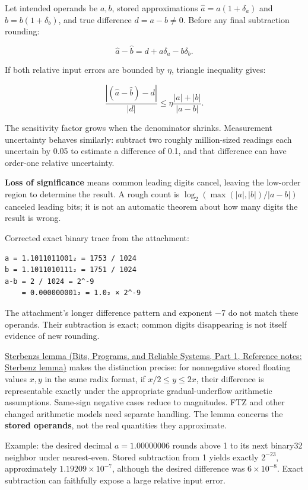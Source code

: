 Let intended operands be \(a,b\), stored approximations \(\widehat a=a(1+\delta_a)\) and \(\widehat b=b(1+\delta_b)\), and true difference \(d=a-b\ne0\). Before any final subtraction rounding:

\[
\widehat a-\widehat b=d+a\delta_a-b\delta_b.
\]

If both relative input errors are bounded by \(\eta\), triangle inequality gives:

\[
\frac{|(\widehat a-\widehat b)-d|}{|d|}
\le\eta\frac{|a|+|b|}{|a-b|}.
\]

The sensitivity factor grows when the denominator shrinks. Measurement uncertainty behaves similarly: subtract two roughly million-sized readings each uncertain by 0.05 to estimate a difference of 0.1, and that difference can have order-one relative uncertainty.

\textbf{Loss of significance} means common leading digits cancel, leaving the low-order region to determine the result. A rough count is \(\log_2(\max(|a|,|b|)/|a-b|)\) canceled leading bits; it is not an automatic theorem about how many digits the result is wrong.

Corrected exact binary trace from the attachment:

\begin{verbatim}
a = 1.1011011001₂ = 1753 / 1024
b = 1.1011010111₂ = 1751 / 1024
a-b = 2 / 1024 = 2^-9
    = 0.000000001₂ = 1.0₂ × 2^-9
\end{verbatim}

The attachment's longer difference pattern and exponent −7 do not match these operands. Their subtraction is exact; common digits disappearing is not itself evidence of new rounding.

\href{../01-Bits-Programs-and-Reliable-Systems-P01/main.pdf\#nameddest=appendix-399b7ad53f39}{Sterbenz\textquotesingle s lemma (Bits, Programs, and Reliable Systems, Part 1, Reference notes: Sterbenz lemma)} makes the distinction precise: for nonnegative stored floating values \(x,y\) in the same radix format, if \(x/2\le y\le2x\), their difference is representable exactly under the appropriate gradual-underflow arithmetic assumptions. Same-sign negative cases reduce to magnitudes. FTZ and other changed arithmetic models need separate handling. The lemma concerns the \textbf{stored operands}, not the real quantities they approximate.

Example: the desired decimal \(a=1.00000006\) rounds above 1 to its next binary32 neighbor under nearest-even. Stored subtraction from 1 yields exactly \(2^{-23}\), approximately \(1.19209\times10^{-7}\), although the desired difference was \(6\times10^{-8}\). Exact subtraction can faithfully expose a large relative input error.

